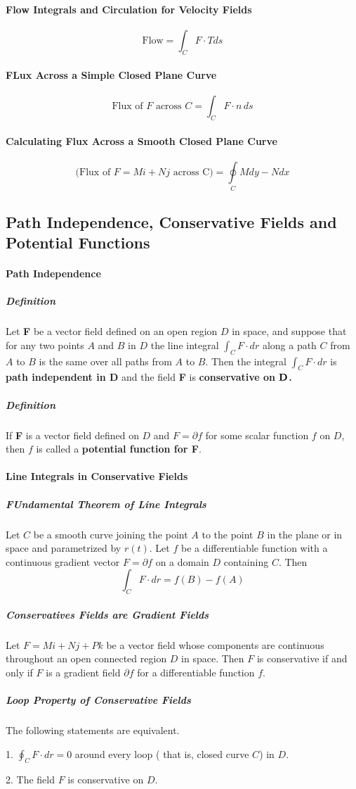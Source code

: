 \documentclass{article}
\begin{document}
            \paragraph{Flow Integrals and Circulation for Velocity Fields}
                \[\text{Flow}=\int_CF\cdot T ds\]
            \paragraph{FLux Across a Simple Closed Plane Curve}
                \[\text{Flux of $F$ across $C$}=\int_CF\cdot n\,ds\]
                \paragraph{Calculating Flux Across a Smooth Closed Plane Curve}
                    \[\text{(Flux of $F=Mi+Nj$ across C)}=\oint\limits_CMdy-Ndx\]
        \subsection{Path Independence, Conservative Fields and Potential Functions}
            \paragraph{Path Independence}
                \subparagraph{Definition} Let \textbf{F} be a vector field defined on an open region $D$ in space, and suppose that for any two points $A$ and $B$ in $D$ the line integral $\int_CF\cdot dr$ along a path $C$
                from $A$ to $B$ is the same over all paths from $A$ to $B$. Then the integral $\int_CF\cdot dr$ is \textbf{path independent in \bf{D}} and the field \textbf{F} is \textbf{conservative on $\bf{D}$.}
                \subparagraph{Definition} If \textbf{F} is a vector field defined on $D$ and $F=\partial f$ for some scalar function $f$ on $D$, then $f$ is called a \textbf{potential function for F}.
            \paragraph{Line Integrals in Conservative Fields}
                \subparagraph{FUndamental Theorem of Line Integrals} Let $C$ be a smooth curve joining the point $A$ to the point $B$ in the plane or in space and parametrized by $r(t)$. Let $f$ be a differentiable function with a continuous gradient vector $F=\partial f$ on a domain $D$ containing $C$. Then
                \[\int_CF\cdot dr=f(B)-f(A)\]
                \subparagraph{Conservatives Fields are Gradient Fields} Let $F=Mi+Nj+Pk$ be a vector field whose components are continuous throughout an open connected region $D$ in space. Then $F$ is conservative if and only if $F$ is a gradient field $\partial f$ for a differentiable function $f$.
                \subparagraph{Loop Property of Conservative Fields} The following statements are equivalent.
                \par 1. $\oint_CF\cdot dr=0$ around every loop ( that is, closed curve $C$) in $D$.
                \par 2. The field $F$ is conservative on $D$.
\end{document}
